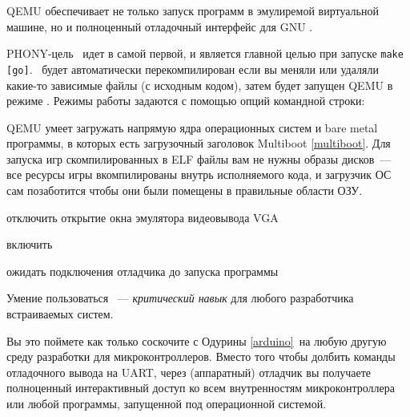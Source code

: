 \label{qemudebug}\secdown

QEMU обеспечивает не только запуск  программ в эмулиремой
виртуальной машине, но и полноценный отладочный интерфейс для GNU .


\clearpage
PHONY-цель \ идет в  самой первой, и является главной
целью при запуске \verb|make [go]|. \ будет автоматически
перекомпилирован если вы меняли или удаляли какие-то зависимые файлы (с
исходным кодом), затем будет запущен QEMU в режиме .
Режимы работы задаются с помощью опций командной строки:

\begin{description}[nosep]
\item[-kernel game.elf] QEMU умеет загружать напрямую ядра операционных систем и
bare metal программы, в которых есть загрузочный заголовок Multiboot
\ref{multiboot}. Для запуска игр скомпилированных в ELF файлы вам не нужны
образы дисков\ --- все ресурсы игры вкомпилированы внутрь исполняемого
кода, и загрузчик ОС сам позаботится чтобы они были помещены в правильные
области ОЗУ.
\item[-nographic] отключить открытие окна эмулятора видеовывода VGA
\item[-s] включить 
\item[-S] ожидать подключения отладчика до запуска программы
\end{description}

\clearpage
\begin{framed}\noindent
Умение пользоваться \ --- \emph{критический навык} для
любого разработчика встраиваемых систем. 
\end{framed}
\noindent
Вы это поймете как только соскочите с Одурины \ref{arduino}\ на любую другую
среду разработки для микроконтроллеров. Вместо того чтобы долбить команды
отладочного вывода на UART, через (аппаратный) отладчик вы получаете полноценный
интерактивный доступ ко всем внутренностям микроконтроллера или любой программы,
запущенной под операционной системой.

